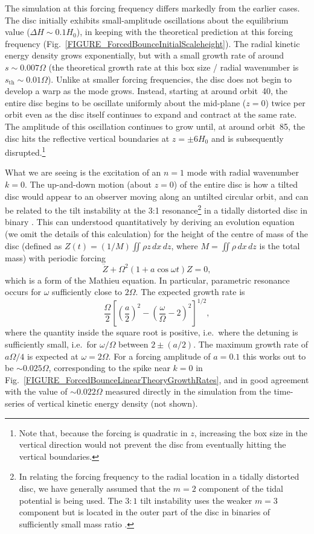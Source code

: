 \documentclass[fleqn,usenatbib]{mnras}
\begin{document}
The simulation at this forcing frequency differs markedly from the earlier cases. The disc initially exhibits small-amplitude oscillations about the equilibrium value ($\Delta H \sim 0.1H_0$), in keeping with the theoretical prediction at this forcing frequency (Fig.~\ref{FIGURE_ForcedBounceInitialScaleheight}). The radial kinetic energy density grows exponentially, but with a small growth rate of around $s \sim 0.007\Omega$ (the theoretical growth rate at this box size / radial wavenumber is $s_{\text{th}} \sim 0.01\Omega$). Unlike at smaller forcing frequencies, the disc does not begin to develop a warp as the mode grows. Instead, starting at around orbit~40, the entire disc begins to be oscillate uniformly about the mid-plane ($z=0$) twice per orbit even as the disc itself continues to expand and contract at the same rate. The amplitude of this oscillation continues to grow until, at around orbit~85, the disc hits the reflective vertical boundaries at $z = \pm 6H_0$ and is subsequently disrupted.\footnote{Note that, because the forcing is quadratic in $z$, increasing the box size in the vertical direction would not prevent the disc from eventually hitting the vertical boundaries.} 

What we are seeing is the excitation of an $n=1$ mode with radial wavenumber $k=0$. The up-and-down motion (about $z=0$) of the entire disc is how a tilted disc would appear to an observer moving along an untilted circular orbit, and can be related to the tilt instability at the 3:1 resonance\footnote{In relating the forcing frequency to the radial location in a tidally distorted disc, we have generally assumed that the $m=2$ component of the tidal potential is being used. The $3:1$ tilt instability uses the weaker $m=3$ component but is located in the outer part of the disc in binaries of sufficiently small mass ratio \citep{lubow1992tidally}.} in a tidally distorted disc in binary \citep{lubow1992tidally}. This can understood quantitatively by deriving an evolution equation (we omit the details of this calculation) for the height of the centre of mass of the disc (defined as $Z(t)=(1/M)\iint\rho z\,dx\, dz$, where $M=\iint\rho\,dx\,dz$ is the total mass) with periodic forcing
\begin{equation}
  \ddot Z+\Omega^2(1+a\cos\omega t)Z=0,
\end{equation}
which is a form of the Mathieu equation. In particular, parametric resonance occurs for $\omega$ sufficiently close to $2\Omega$. The expected growth rate is
\begin{equation}
  \frac{\Omega}{2}\left[\left(\frac{a}{2}\right)^2-\left(\frac{\omega}{\Omega}-2\right)^2\right]^{1/2},
\end{equation}
where the quantity inside the square root is positive, i.e.\ where the detuning is sufficiently small, i.e.\ for $\omega/\Omega$ between $2\pm(a/2)$. The maximum growth rate of $a\Omega/4$ is expected at $\omega=2\Omega$. For a forcing amplitude of $a=0.1$ this works out to be $\sim 0.025\Omega$, corresponding to the spike near $k=0$ in Fig.~\ref{FIGURE_ForcedBounceLinearTheoryGrowthRates}, and in good agreement with the value of $\sim 0.022\Omega$ measured directly in the simulation from the time-series of vertical kinetic energy density (not shown).
\end{document}
